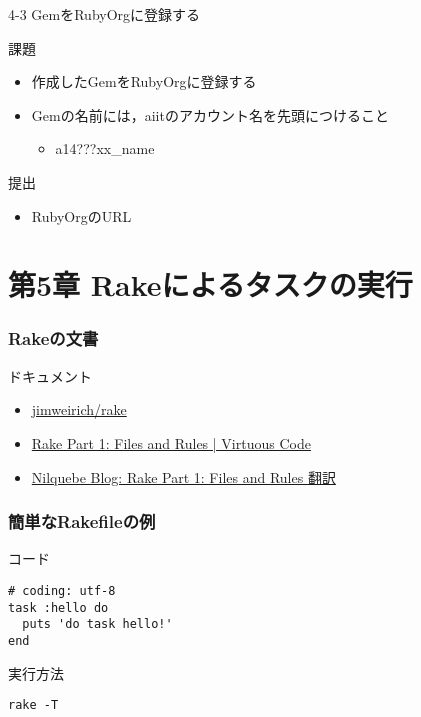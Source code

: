 \documentclass[t, aspectratio=169]{beamer}
\begin{document}
\begin{frame}[label=sec-4-4-3]{4-3 GemをRubyOrgに登録する}
\begin{block}{課題}
\begin{itemize}
\item 作成したGemをRubyOrgに登録する
\item Gemの名前には，aiitのアカウント名を先頭につけること
\begin{itemize}
\item a14???xx\_name
\end{itemize}
\end{itemize}
\end{block}
\begin{block}{提出}
\begin{itemize}
\item RubyOrgのURL
\end{itemize}
\end{block}
\end{frame}
\part{第5章 Rakeによるタスクの実行}
\label{sec-5}
\section{Rakeの文書}
\label{sec-5-1}
\begin{frame}[label=sec-5-1-1]{ドキュメント}
\begin{itemize}
\item \href{https://github.com/jimweirich/rake}{jimweirich/rake}
\item \href{http://devblog.avdi.org/2014/04/21/rake-part-1-basics/}{Rake Part 1: Files and Rules | Virtuous Code}
\item \href{http://nilquebe.blogspot.jp/2014/06/learn-advanced-rake-in-7-episodes.html}{Nilquebe Blog: Rake Part 1: Files and Rules 翻訳}
\end{itemize}
\end{frame}

\section{簡単なRakefileの例}
\label{sec-5-2}
\begin{frame}[fragile,label=sec-5-2-1]{コード}
 \begin{verbatim}
# coding: utf-8
task :hello do
  puts 'do task hello!'
end
\end{verbatim}
\end{frame}

\begin{frame}[fragile,label=sec-5-2-2]{実行方法}
 \begin{verbatim}
rake -T
\end{verbatim}
\end{frame}
\end{document}
